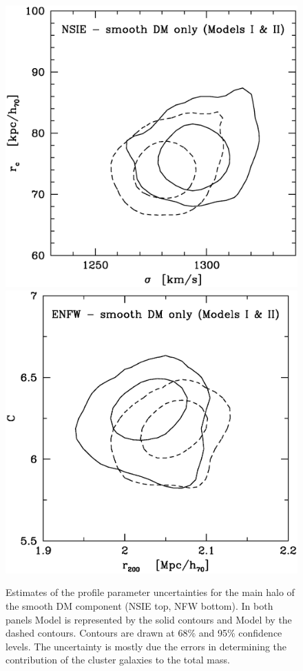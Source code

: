 \documentclass[useAMS,usenatbib]{mn2e}
\newcounter{one}   \setcounter{one}{1}
\newcounter{two}   \setcounter{two}{2}
\begin{document}
\begin{figure}
  \centering
  \includegraphics[height=0.7\columnwidth]{figs/sigma_core_conf_gbbs.ps}\\
  \includegraphics[height=0.7\columnwidth]{figs/r200_C_conf_gbbs.ps}
  \caption{Estimates of the profile parameter uncertainties for the
    main halo of the smooth DM component (NSIE top, NFW bottom). In
    both panels Model  is represented by the solid contours
    and Model  by the dashed contours. Contours are drawn
    at 68\% and 95\% confidence levels. The uncertainty is mostly due
    the errors in determining the contribution of the cluster galaxies
    to the total mass.}
  \label{fig:param_errors}
\end{figure}
\end{document}
